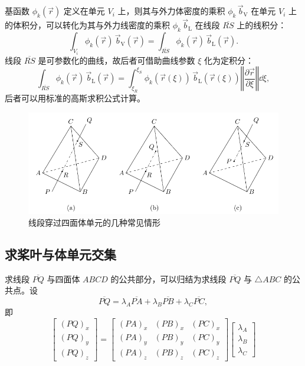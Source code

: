 基函数 $\phi_{k}(\vec{r})$ 定义在单元 $V_{i}$ 上，则其与外力体密度的乘积 $\phi_{k}\,\vec{b}_{\mathrm{V}}$
在单元 $V_{i}$ 上的体积分，可以转化为其与外力线密度的乘积 $\phi_{k}\,\vec{b}_{\mathrm{L}}$
在线段 $\overline{RS}$ 上的线积分：
\begin{equation}
\int_{V_{i}}\phi_{k}(\vec{r})\,\vec{b}_{\mathrm{V}}(\vec{r})=\int_{\overline{RS}}\phi_{k}(\vec{r})\,\vec{b}_{\mathrm{L}}(\vec{r}).\label{eq:body_force}
\end{equation}
线段 $\overline{RS}$ 是可参数化的曲线，故后者可借助曲线参数 $\xi$ 化为定积分：
\begin{equation}
\int_{\overline{RS}}\phi_{k}(\vec{r})\,\vec{b}_{\mathrm{L}}(\vec{r})=\int_{\xi_{R}}^{\xi_{S}}\phi_{k}(\vec{r}(\xi))\,\vec{b}_{\mathrm{L}}(\vec{r}(\xi))\left\Vert \frac{\partial\vec{r}}{\partial\xi}\right\Vert \dd{\xi},
\end{equation}
后者可以用标准的高斯求积公式计算。
\begin{figure}[h!]
\begin{centering}
\includegraphics[width=1\textwidth]{figures/PQ}
\par\end{centering}
\caption{\label{fig:PQ}线段穿过四面体单元的几种常见情形}
\end{figure}


\subsection{求桨叶与体单元交集}

求线段 $\overline{PQ}$ 与四面体 $ABCD$ 的公共部分，可以归结为求线段 $\overline{PQ}$
与 $\triangle ABC$ 的公共点。设
\begin{equation}
\overline{PQ}=\lambda_{A}\overline{PA}+\lambda_{B}\overline{PB}+\lambda_{C}\overline{PC},
\end{equation}
即
\begin{equation}
\begin{bmatrix}(PQ)_{x}\\
(PQ)_{y}\\
(PQ)_{z}
\end{bmatrix}=\begin{bmatrix}(PA)_{x} & (PB)_{x} & (PC)_{x}\\
(PA)_{y} & (PB)_{y} & (PC)_{y}\\
(PA)_{z} & (PB)_{z} & (PC)_{z}
\end{bmatrix}\begin{bmatrix}\lambda_{A}\\
\lambda_{B}\\
\lambda_{C}
\end{bmatrix}\label{eq:segment_triangle_intersection}
\end{equation}


